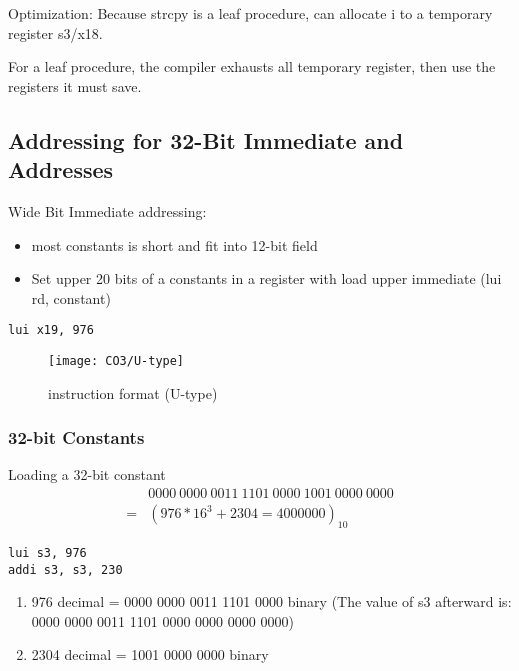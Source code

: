 Optimization: Because strcpy is a leaf procedure, can allocate i to a temporary register s3/x18. 

For a leaf procedure, the compiler exhausts all temporary register, then use the registers it must save. 


\subsection{Addressing for 32-Bit Immediate and Addresses}
Wide Bit Immediate addressing:
\begin{itemize}
    \item most constants is short and fit into 12-bit field
    \item Set upper 20 bits of a constants in a register with load upper immediate (lui rd, constant)
\end{itemize}

\begin{lstlisting}[language={[x86masm]Assembler}]
    lui x19, 976
    \end{lstlisting}

\begin{figure}[!htb]
    \centering
    \texttt{[image: CO3/U-type]}
    \caption{instruction format (U-type)}
\end{figure}

\subsubsection{32-bit Constants}
Loading a 32-bit constant
\begin{align*}
    &0000\ 0000\ 0011\ 1101\ 0000\ 1001\ 0000\ 0000\\ 
    =&(976*16^3 + 2304=4000000)_{10}
\end{align*}

\begin{lstlisting}[language={[x86masm]Assembler},title={RISC-V code}]
lui s3, 976
addi s3, s3, 230
\end{lstlisting}
\begin{enumerate}
    \item 976 decimal = 0000 0000 0011 1101 0000 binary (The value of s3 afterward is: 0000 0000 0011 1101 0000 0000 0000 0000)
    \item 2304 decimal = 1001 0000 0000 binary
\end{enumerate}


